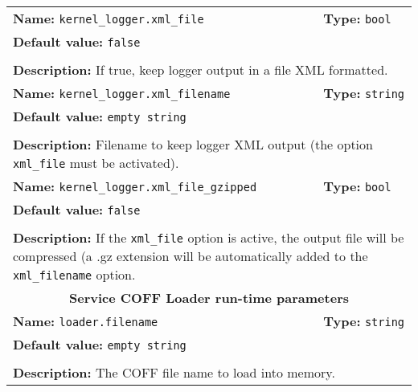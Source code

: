 \newpage
\begin{center}
	\begin{tabular}{|p{7.5cm}|p{7.5cm}|}
	\hline
	\multicolumn{1}{|p{7.5cm}}{\textbf{Name:} \texttt{kernel\_logger.xml\_file}} & \multicolumn{1}{p{7.5cm}|}{\textbf{Type:} \texttt{bool}}\\
	\multicolumn{2}{|p{15cm}|}{\textbf{Default value:} \texttt{false}}\\
	\multicolumn{2}{|l|}{}\\
	\multicolumn{2}{|p{15cm}|}{\textbf{Description:} \newline If true, keep logger output in a file XML formatted.}\\
	\hline
	\multicolumn{1}{|p{7.5cm}}{\textbf{Name:} \texttt{kernel\_logger.xml\_filename}} & \multicolumn{1}{p{7.5cm}|}{\textbf{Type:} \texttt{string}}\\
	\multicolumn{2}{|p{15cm}|}{\textbf{Default value:} \texttt{empty string}}\\
	\multicolumn{2}{|l|}{}\\
	\multicolumn{2}{|p{15cm}|}{\textbf{Description:} \newline Filename to keep logger XML output (the option \texttt{xml\_file} must be activated).}\\
	\hline
	\multicolumn{1}{|p{7.5cm}}{\textbf{Name:} \texttt{kernel\_logger.xml\_file\_gzipped}} & \multicolumn{1}{p{7.5cm}|}{\textbf{Type:} \texttt{bool}}\\
	\multicolumn{2}{|p{15cm}|}{\textbf{Default value:} \texttt{false}}\\
	\multicolumn{2}{|l|}{}\\
	\multicolumn{2}{|p{15cm}|}{\textbf{Description:} \newline If the \texttt{xml\_file} option is active, the output file will be compressed (a .gz extension will be automatically added to the \texttt{xml\_filename} option.}\\
	\hline
	\multicolumn{2}{|c|}{\textbf{\large Service COFF Loader run-time parameters}}\\
	\hline
	\multicolumn{1}{|p{7.5cm}}{\textbf{Name:} \texttt{loader.filename}} & \multicolumn{1}{p{7.5cm}|}{\textbf{Type:} \texttt{string}}\\
	\multicolumn{2}{|p{15cm}|}{\textbf{Default value:} \texttt{empty string}}\\
	\multicolumn{2}{|l|}{}\\
	\multicolumn{2}{|p{15cm}|}{\textbf{Description:} \newline The COFF file name to load into memory.}\\

\end{tabular}
\end{center}
